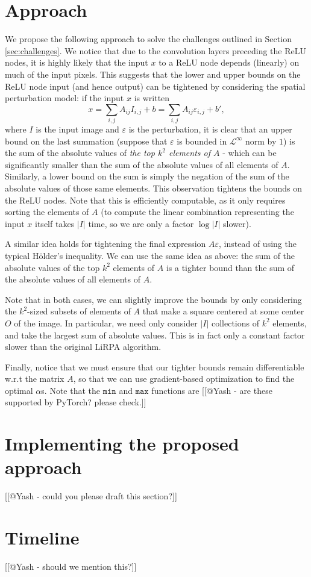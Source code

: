 \documentclass{article}
\begin{document}
\section{Approach}\label{sec:approach}

We propose the following approach to solve the challenges outlined in Section \ref{sec:challenges}. We notice that due to the convolution layers preceding the ReLU nodes, it is highly likely that the input $x$ to a ReLU node depends (linearly) on much of the input pixels. This suggests that the lower and upper bounds on the ReLU node input (and hence output) can be tightened by considering the spatial perturbation model: if the input $x$ is written
\[
    x = \sum_{i,j} A_{ij} I_{i,j} + b = \sum_{i,j} A_{ij} \varepsilon_{i,j} + b',
\]
where $I$ is the input image and $\varepsilon$ is the perturbation, it is clear that an upper bound on the last summation (suppose that $\varepsilon$ is bounded in $\mathcal L^\infty$ norm by $1$) is the sum of the absolute values of \emph{the top $k^2$ elements of $A$} - which can be significantly smaller than the sum of the absolute values of all elements of $A$. Similarly, a lower bound on the sum is simply the negation of the sum of the absolute values of those same elements. This observation tightens the bounds on the ReLU nodes. Note that this is efficiently computable, as it only requires sorting the elements of $A$ (to compute the linear combination representing the input $x$ itself takes $|I|$ time, so we are only a factor $\log |I|$ slower).

A similar idea holds for tightening the final expression $A\varepsilon$, instead of using the typical Hölder's inequality. We can use the same idea as above: the sum of the absolute values of the top $k^2$ elements of $A$ is a tighter bound than the sum of the absolute values of all elements of $A$.

Note that in both cases, we can slightly improve the bounds by only considering the $k^2$-sized subsets of elements of $A$ that make a square centered at some center $O$ of the image. In particular, we need only consider $|I|$ collections of $k^2$ elements, and take the largest sum of absolute values. This is in fact only a constant factor slower than the original LiRPA algorithm.

Finally, notice that we must ensure that our tighter bounds remain differentiable w.r.t the matrix $A$, so that we can use gradient-based optimization to find the optimal $\alpha$s. Note that the $\texttt{min}$ and $\texttt{max}$ functions are [[@Yash - are these supported by PyTorch? please check.]]

\section{Implementing the proposed approach}

[[@Yash - could you please draft this section?]]

\section{Timeline}

[[@Yash - should we mention this?]]
\end{document}

